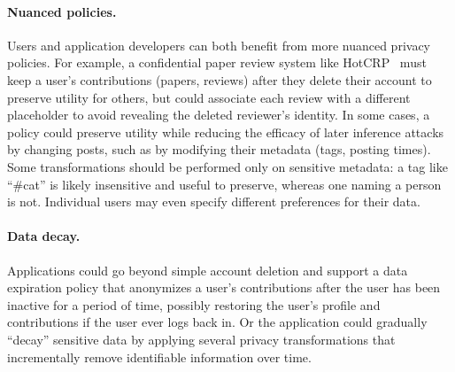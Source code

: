 \paragraph{Nuanced policies.}
%
Users and application developers can both benefit from more nuanced privacy policies.
%
For example, a confidential paper review system like HotCRP~\cite{hotcrp} must keep a
user's contributions
(papers, reviews) after they delete their account to preserve utility for others, but could
associate each review with a different placeholder to avoid revealing the deleted reviewer's
identity.
%
In some cases, a policy could preserve utility while reducing the efficacy of later inference
attacks by changing posts, such as by modifying their metadata (\eg tags, posting times).
%
Some transformations should be performed only on sensitive metadata:
a tag like “\#cat” is likely insensitive and useful to preserve, whereas one naming a person is not.
%
%
Individual users may even specify different preferences for their data.
%
%

\paragraph{Data decay.}
%
Applications could go beyond simple account deletion and support a data expiration policy that
anonymizes a user's contributions after the user has been inactive for a period of time,
possibly restoring the user's profile and contributions if the user ever logs back in.
%
Or the application could gradually ``decay'' sensitive data by applying several privacy
transformations that incrementally remove identifiable information over time.
%

